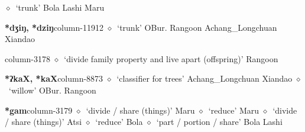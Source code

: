 \hspace{1ex}
         $\diamond$~`trunk'
         Bola 
\hspace{1ex}
         Lashi 
\hspace{1ex}
         Maru 
  \item {\footnotesize \textbf{*dʒiŋ, *dziŋ}}{\tiny column-11912}
         $\diamond$~`trunk'
         OBur. 
\hspace{1ex}
         Rangoon 
\hspace{1ex}
         Achang\_Longchuan 
\hspace{1ex}
         Xiandao 
  \item {\footnotesize \textbf{}}{\tiny column-3178}
         $\diamond$~`divide family property and live apart (offspring)'
         Rangoon 
  \item {\footnotesize \textbf{*ʔkaX, *kaX}}{\tiny column-8873}
         $\diamond$~`classifier for trees'
         Achang\_Longchuan 
\hspace{1ex}
         Xiandao 
\hspace{1ex}
         $\diamond$~`willow'
         OBur. 
\hspace{1ex}
         Rangoon 
  \item {\footnotesize \textbf{*gam}}{\tiny column-3179}
         $\diamond$~`divide / share (things)'
         Maru 
\hspace{1ex}
         $\diamond$~`reduce'
         Maru 
\hspace{1ex}
         $\diamond$~`divide / share (things)'
         Atsi 
\hspace{1ex}
         $\diamond$~`reduce'
         Bola 
\hspace{1ex}
         $\diamond$~`part / portion / share'
         Bola 
\hspace{1ex}
         Lashi 
